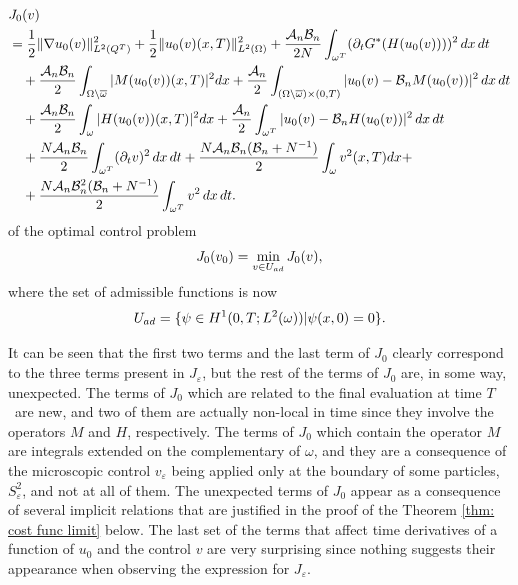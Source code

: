 \documentclass[10pt,a4paper]{amsart}
\numberwithin{equation}{section}
\begin{document}
\begin{equation}
\begin{aligned}
&J_0(v) \\
&=  \frac{1}{2}\| \nabla u_0(v)\| _{L^2(Q^{T})}^2+\frac{1}{2}\|
u_0(v)(x,T)\| _{L^2(\Omega )}^2 + \frac{\mathcal{A}_n\mathcal{B}_n}{2N}
\int _{\omega ^{T}}(\partial _{t}G^{\ast }(H(u_0(v))))^2 \,dx\,dt
  \\
&\quad +\frac{\mathcal{A}_n\mathcal{B}_n}{2}\int _{\Omega \setminus
\overline{\omega }}|M(u_0(v))(x,T)|^2{dx}+\frac{\mathcal{A}_n}{2}
\int _{(\Omega \setminus \overline{\omega })\times (0,T)}|u_0(v)-\mathcal{B}
_nM(u_0(v))|^2\,dx\,dt    \\
&\quad +\frac{\mathcal{A}_n\mathcal{B}_n}{2}\int _{\omega }|H(u_0(v))(x,T)|^2{%
dx}+\frac{\mathcal{A}_n}{2}\int _{\omega ^{T}}|u_0(v)-\mathcal{B}%
_nH(u_0(v))|^2\,dx\,dt    \\
&\quad +\frac{N\mathcal{A}_n\mathcal{B}_n}{2}\int _{\omega ^{T}}(\partial
_{t}v)^2\,dx\,dt+\frac{N\mathcal{A}_n\mathcal{B}_n(\mathcal{B}_n+N^{-1})}{2}\int _{\omega }v^2(x,T){dx}+    \\
&\quad +\frac{N\mathcal{A}_n\mathcal{B}_n^2(\mathcal{B}_n+N^{-1})}{2}\int _{%
\omega ^{T}}v^2\,dx\,dt.
\end{aligned} \label{limit functional}
\end{equation}
of the optimal control problem
\begin{equation}
J_0(v_0)=\min _{v\in U_{\rm ad}}J_0(v),
\end{equation}
where the set of admissible functions is now
\[
U_{\rm ad}=\{ \psi \in H^{1}(0,T;L^2(\omega ))|\psi (x,0)=0\}.
\]

It can be seen that the first two terms and the last term of $J_0$ clearly
correspond to the three terms present in $J_{\varepsilon }$, but the rest of
the terms of $J_0$ are, in some way, unexpected. The terms of $J_0$
which are related to the final evaluation at time $T$ \ are new, and two of
them are actually non-local in time since they involve the operators $M$ and
$H$, respectively. The terms of $J_0$ which contain the operator $M$ are
integrals extended on the complementary of $\omega $, and they are a
consequence of the microscopic control $v_{\varepsilon }$ being applied only
at the boundary of some particles, $S_{\varepsilon }^2$, and not at all of
them. The unexpected terms of $J_0$ appear as a consequence of several
implicit relations that are justified in the proof of the Theorem 
\ref{thm: cost func limit} below. The last set of the terms that affect time
derivatives of a function of $u_0$ and the control $v$ are very surprising
since nothing suggests their appearance when observing the expression for 
$J_{\varepsilon }$.
\end{document}
